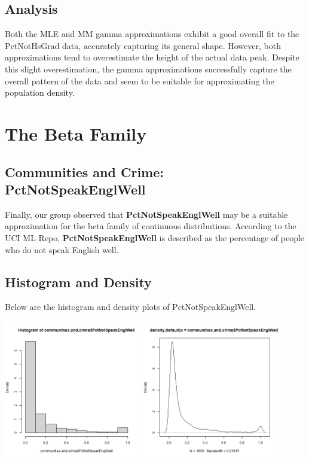 \documentclass[12pt, letterpaper]{report}
\begin{document}
\section{Analysis}
Both the MLE and MM gamma approximations exhibit a good overall fit to the PctNotHsGrad data, accurately capturing its general shape.
However, both approximations tend to overestimate the height of the actual data peak.
Despite this slight overestimation, the gamma approximations successfully capture the overall pattern of the data and seem to be suitable for approximating the population density.



\maketitle
\chapter{The Beta Family}
\section{Communities and Crime: PctNotSpeakEnglWell}

Finally, our group observed that \textbf{PctNotSpeakEnglWell} may be a suitable approximation for the beta family of continuous distributions.
According to the UCI ML Repo, \textbf{PctNotSpeakEnglWell} is described as the percentage of people who do not speak English well. 

\section{Histogram and Density}
Below are the histogram and density plots of PctNotSpeakEnglWell.
\begin{center}
\includegraphics[width=0.45\textwidth]{beta/PctNotSpeakEnglWell_hist}
\includegraphics[width=0.45\textwidth]{beta/PctNotSpeakEnglWell_density}
\end{center}
\end{document}
